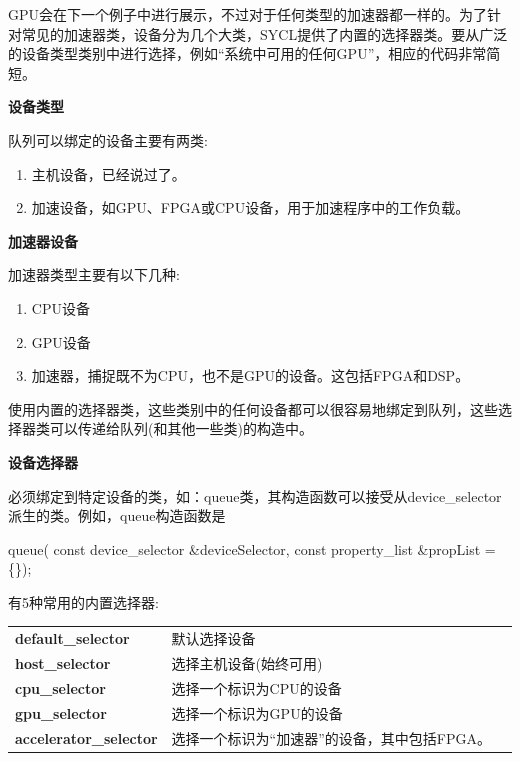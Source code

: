GPU会在下一个例子中进行展示，不过对于任何类型的加速器都一样的。为了针对常见的加速器类，设备分为几个大类，SYCL提供了内置的选择器类。要从广泛的设备类型类别中进行选择，例如“系统中可用的任何GPU”，相应的代码非常简短。\par

\hspace*{\fill} \par %
\textbf{设备类型}

队列可以绑定的设备主要有两类:\par

\begin{enumerate}
	\item 主机设备，已经说过了。
	\item 加速设备，如GPU、FPGA或CPU设备，用于加速程序中的工作负载。
\end{enumerate}

\hspace*{\fill} \par %
\textbf{加速器设备}

加速器类型主要有以下几种:\par

\begin{enumerate}
	\item CPU设备
	\item GPU设备
	\item 加速器，捕捉既不为CPU，也不是GPU的设备。这包括FPGA和DSP。
\end{enumerate}

使用内置的选择器类，这些类别中的任何设备都可以很容易地绑定到队列，这些选择器类可以传递给队列(和其他一些类)的构造中。\par

\hspace*{\fill} \par %
\textbf{设备选择器}

必须绑定到特定设备的类，如：queue类，其构造函数可以接受从device\_selector派生的类。例如，queue构造函数是\par

\begin{tcolorbox}[colback=green!5!white,colframe=green!75!black]
queue( const device\_selector \&deviceSelector, const property\_list \&propList = \{\});
\end{tcolorbox}

有5种常用的内置选择器:\par

\hspace*{\fill} \par %
\begin{tabular}{lp{10cm}p{10cm}}
	\toprule  %
	\textbf{default\_selector}& 默认选择设备 \\
	\textbf{host\_selector}& 选择主机设备(始终可用) \\
	\textbf{cpu\_selector}& 选择一个标识为CPU的设备\\
	\textbf{gpu\_selector}& 选择一个标识为GPU的设备\\
	\textbf{accelerator\_selector}&选择一个标识为“加速器”的设备，其中包括FPGA。\\
	\bottomrule %
\end{tabular}


